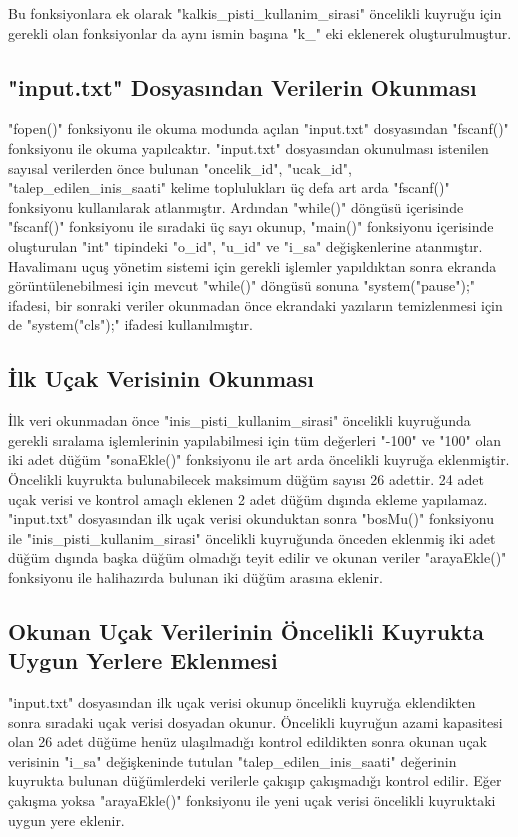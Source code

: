 \documentclass[conference]{IEEEtran}
\begin{document}
Bu fonksiyonlara ek olarak "kalkis\_pisti\_kullanim\_sirasi" öncelikli kuyruğu 
için gerekli olan fonksiyonlar da aynı ismin başına "k\_" eki eklenerek 
oluşturulmuştur.\\

\subsection{"input.txt" Dosyasından Verilerin Okunması}
"fopen()" fonksiyonu ile okuma modunda açılan "input.txt" dosyasından "fscanf()"
fonksiyonu ile okuma yapılcaktır. "input.txt" dosyasından okunulması istenilen 
sayısal verilerden önce bulunan "oncelik\_id", "ucak\_id", 
"talep\_edilen\_inis\_saati" kelime toplulukları üç defa art arda "fscanf()" 
fonksiyonu kullanılarak atlanmıştır. Ardından "while()" döngüsü içerisinde 
"fscanf()" fonksiyonu ile sıradaki üç sayı okunup, "main()" fonksiyonu 
içerisinde oluşturulan "int" tipindeki "o\_id", "u\_id" ve "i\_sa" 
değişkenlerine atanmıştır.\\

Havalimanı uçuş yönetim sistemi için gerekli işlemler
yapıldıktan sonra ekranda görüntülenebilmesi için mevcut "while()" döngüsü 
sonuna "system("pause");" ifadesi, bir sonraki veriler okunmadan önce ekrandaki 
yazıların temizlenmesi için de "system("cls");" ifadesi kullanılmıştır.\\

\subsection{İlk Uçak Verisinin Okunması}
İlk veri okunmadan önce "inis\_pisti\_kullanim\_sirasi" öncelikli kuyruğunda 
gerekli sıralama işlemlerinin yapılabilmesi için tüm değerleri "-100" ve "100" 
olan iki adet düğüm "sonaEkle()" fonksiyonu ile art arda öncelikli kuyruğa 
eklenmiştir.  Öncelikli kuyrukta bulunabilecek maksimum düğüm sayısı 26 adettir. 24 
adet uçak verisi ve kontrol amaçlı eklenen 2 adet düğüm dışında ekleme 
yapılamaz. \\

"input.txt" dosyasından ilk uçak verisi okunduktan sonra "bosMu()" 
fonksiyonu ile "inis\_pisti\_kullanim\_sirasi" öncelikli kuyruğunda önceden 
eklenmiş iki adet düğüm dışında başka düğüm olmadığı teyit edilir ve okunan 
veriler "arayaEkle()" fonksiyonu ile halihazırda bulunan iki düğüm arasına 
eklenir.\\

\subsection{Okunan Uçak Verilerinin Öncelikli Kuyrukta Uygun Yerlere Eklenmesi}
"input.txt" dosyasından ilk uçak verisi okunup öncelikli kuyruğa eklendikten 
sonra sıradaki uçak verisi dosyadan okunur. Öncelikli kuyruğun azami 
kapasitesi olan 26 adet düğüme henüz ulaşılmadığı kontrol edildikten sonra 
okunan uçak verisinin "i\_sa" değişkeninde tutulan "talep\_edilen\_inis\_saati" 
değerinin kuyrukta bulunan düğümlerdeki verilerle çakışıp çakışmadığı kontrol 
edilir. Eğer çakışma yoksa "arayaEkle()" fonksiyonu ile yeni uçak verisi 
öncelikli kuyruktaki uygun yere eklenir.\\
\end{document}

